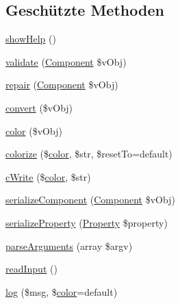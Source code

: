 \subsection*{Geschützte Methoden}
\begin{DoxyCompactItemize}
\item 
\mbox{\hyperlink{class_sabre_1_1_v_object_1_1_cli_a15438a1d08a2880b8807fcafd9f1308f}{show\+Help}} ()
\item 
\mbox{\hyperlink{class_sabre_1_1_v_object_1_1_cli_a9c9cc797f2f58327b0c84455631a95a7}{validate}} (\mbox{\hyperlink{class_sabre_1_1_v_object_1_1_component}{Component}} \$v\+Obj)
\item 
\mbox{\hyperlink{class_sabre_1_1_v_object_1_1_cli_a4f22de98cf2040fbb69ee9f36055e099}{repair}} (\mbox{\hyperlink{class_sabre_1_1_v_object_1_1_component}{Component}} \$v\+Obj)
\item 
\mbox{\hyperlink{class_sabre_1_1_v_object_1_1_cli_a9f85891dab426619be611a6c424ef7f5}{convert}} (\$v\+Obj)
\item 
\mbox{\hyperlink{class_sabre_1_1_v_object_1_1_cli_a37d5b2f618505f105122850bc05308cd}{color}} (\$v\+Obj)
\item 
\mbox{\hyperlink{class_sabre_1_1_v_object_1_1_cli_a4e3849c3103aaeae3c51fd692dc718b4}{colorize}} (\$\mbox{\hyperlink{class_sabre_1_1_v_object_1_1_cli_a37d5b2f618505f105122850bc05308cd}{color}}, \$str, \$reset\+To=\textquotesingle{}default\textquotesingle{})
\item 
\mbox{\hyperlink{class_sabre_1_1_v_object_1_1_cli_a4f18e4badc7908a37608183397deda05}{c\+Write}} (\$\mbox{\hyperlink{class_sabre_1_1_v_object_1_1_cli_a37d5b2f618505f105122850bc05308cd}{color}}, \$str)
\item 
\mbox{\hyperlink{class_sabre_1_1_v_object_1_1_cli_a25ca973d3dd00dd1ac036537b067f1f7}{serialize\+Component}} (\mbox{\hyperlink{class_sabre_1_1_v_object_1_1_component}{Component}} \$v\+Obj)
\item 
\mbox{\hyperlink{class_sabre_1_1_v_object_1_1_cli_adc5de6d5506735971011d05cca306aa6}{serialize\+Property}} (\mbox{\hyperlink{class_sabre_1_1_v_object_1_1_property}{Property}} \$property)
\item 
\mbox{\hyperlink{class_sabre_1_1_v_object_1_1_cli_a1dd6fc8d2dcd430f915df78e9f7cff74}{parse\+Arguments}} (array \$argv)
\item 
\mbox{\hyperlink{class_sabre_1_1_v_object_1_1_cli_af6efe7e3dd222f17e1084e22eef46a2b}{read\+Input}} ()
\item 
\mbox{\hyperlink{class_sabre_1_1_v_object_1_1_cli_a60d820c0444ed708add6195ee68d76b4}{log}} (\$msg, \$\mbox{\hyperlink{class_sabre_1_1_v_object_1_1_cli_a37d5b2f618505f105122850bc05308cd}{color}}=\textquotesingle{}default\textquotesingle{})
\end{DoxyCompactItemize}
